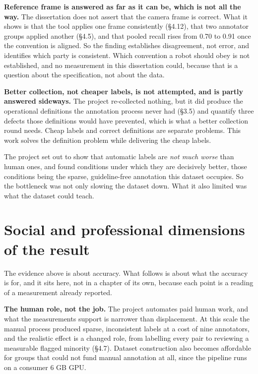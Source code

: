 \textbf{Reference frame is answered as far as it can be, which is not all the way.} The dissertation does not assert that the camera frame is correct. What it shows is that the tool applies one frame consistently (\S{}4.12), that two annotator groups applied another (\S{}4.5), and that pooled recall rises from 0.70 to 0.91 once the convention is aligned. So the finding establishes disagreement, not error, and identifies which party is consistent. Which convention a robot should obey is not established, and no measurement in this dissertation could, because that is a question about the specification, not about the data.

\textbf{Better collection, not cheaper labels, is not attempted, and is partly answered sideways.} The project re-collected nothing, but it did produce the operational definitions the annotation process never had (\S{}3.5) and quantify three defects those definitions would have prevented, which is what a better collection round needs. Cheap labels and correct definitions are separate problems. This work solves the definition problem while delivering the cheap labels.

The project set out to show that automatic labels are \textit{not much worse} than human ones, and found conditions under which they are decisively better, those conditions being the sparse, guideline-free annotation this dataset occupies. So the bottleneck was not only slowing the dataset down. What it also limited was what the dataset could teach.

\section{Social and professional dimensions of the result}

The evidence above is about accuracy. What follows is about what the accuracy is for, and it sits here, not in a chapter of its own, because each point is a reading of a measurement already reported.

\textbf{The human role, not the job.} The project automates paid human work, and what the measurements support is narrower than displacement. At this scale the manual process produced sparse, inconsistent labels at a cost of nine annotators, and the realistic effect is a changed role, from labelling every pair to reviewing a measurable flagged minority (\S{}4.7). Dataset construction also becomes affordable for groups that could not fund manual annotation at all, since the pipeline runs on a consumer 6 GB GPU.

